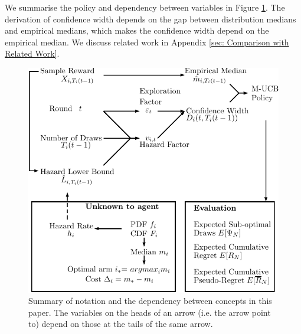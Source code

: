 We summarise the policy \ourpolicy \space and dependency between variables in Figure \ref{fig: Dependency Diagram of HazardUCB}.
The derivation of confidence width depends on the gap between distribution medians and empirical medians, which makes the confidence width depend on the empirical median. We discuss related work in Appendix \ref{sec: Comparison with Related Work}.

\begin{figure}[t]
    \centering
    \includegraphics[scale=0.7]{plots/dependency_diagram.pdf}
    \caption{Summary of notation and the dependency between concepts in this paper.
    The variables on the heads of an arrow (i.e. the arrow point to) depend on those at the tails of the same arrow.
    }
    \label{fig: Dependency Diagram of HazardUCB}
\end{figure}


